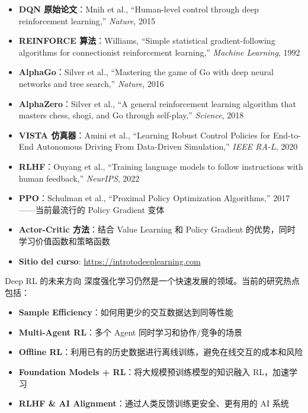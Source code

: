 \begin{itemize}
    \item \textbf{DQN 原始论文}：Mnih et al., ``Human-level control through deep reinforcement learning,'' \textit{Nature}, 2015
    \item \textbf{REINFORCE 算法}：Williams, ``Simple statistical gradient-following algorithms for connectionist reinforcement learning,'' \textit{Machine Learning}, 1992
    \item \textbf{AlphaGo}：Silver et al., ``Mastering the game of Go with deep neural networks and tree search,'' \textit{Nature}, 2016
    \item \textbf{AlphaZero}：Silver et al., ``A general reinforcement learning algorithm that masters chess, shogi, and Go through self-play,'' \textit{Science}, 2018
    \item \textbf{VISTA 仿真器}：Amini et al., ``Learning Robust Control Policies for End-to-End Autonomous Driving From Data-Driven Simulation,'' \textit{IEEE RA-L}, 2020
    \item \textbf{RLHF}：Ouyang et al., ``Training language models to follow instructions with human feedback,'' \textit{NeurIPS}, 2022
    \item \textbf{PPO}：Schulman et al., ``Proximal Policy Optimization Algorithms,'' 2017------当前最流行的 Policy Gradient 变体
    \item \textbf{Actor-Critic 方法}：结合 Value Learning 和 Policy Gradient 的优势，同时学习价值函数和策略函数
    \item \textbf{Sitio del curso}: \url{https://introtodeeplearning.com}
\end{itemize}

\begin{knowledgebox}{Deep RL 的未来方向}
深度强化学习仍然是一个快速发展的领域。当前的研究热点包括：
\begin{itemize}
    \item \textbf{Sample Efficiency}：如何用更少的交互数据达到同等性能
    \item \textbf{Multi-Agent RL}：多个 Agent 同时学习和协作/竞争的场景
    \item \textbf{Offline RL}：利用已有的历史数据进行离线训练，避免在线交互的成本和风险
    \item \textbf{Foundation Models + RL}：将大规模预训练模型的知识融入 RL，加速学习
    \item \textbf{RLHF \& AI Alignment}：通过人类反馈训练更安全、更有用的 AI 系统
\end{itemize}
\end{knowledgebox}




